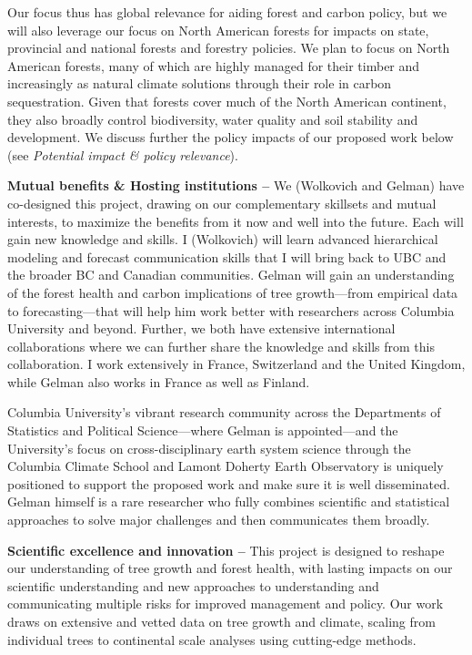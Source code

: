 \documentclass[11pt]{article}
\begin{document}
Our focus thus has global relevance for aiding forest and carbon policy, but we will also leverage our focus on North American forests for impacts on state, provincial and national forests and forestry policies. We plan to focus on North American forests, many of which are highly managed for their timber and increasingly as natural climate solutions through their role in carbon sequestration. Given that forests cover much of the North American continent, they also broadly control biodiversity, water quality and soil stability and development. We discuss further the policy impacts of our proposed work below (see \emph{Potential impact \& policy relevance}). 


{\bf Mutual benefits \& Hosting institutions -- }
We (Wolkovich and Gelman) have co-designed this project, drawing on our complementary skillsets and mutual interests, to maximize the benefits from it now and well into the future. Each will gain new knowledge and skills. I (Wolkovich) will learn advanced hierarchical modeling and forecast communication skills that I will bring back to UBC and the broader BC and Canadian communities. Gelman will gain an understanding of the forest health and carbon implications of tree growth---from empirical data to forecasting---that will help him work better with researchers across Columbia University and beyond. Further, we both have extensive international collaborations where we can further share the knowledge and skills from this collaboration. I work extensively in France, Switzerland and the United Kingdom, while Gelman also works in France as well as Finland. 

Columbia University's vibrant research community across the Departments of Statistics and Political Science---where Gelman is appointed---and the University's focus on cross-disciplinary earth system science through the Columbia Climate School and Lamont Doherty Earth Observatory is uniquely positioned to support the proposed work and make sure it is well disseminated. Gelman himself is a rare researcher who fully combines scientific and statistical approaches to solve major challenges and then communicates them broadly. %

{\bf Scientific excellence and innovation -- } 
This project is designed to reshape our understanding of tree growth and forest health, with lasting impacts on our scientific understanding and new approaches to understanding and communicating multiple risks for improved management and policy. Our work draws on extensive and vetted data on tree growth and climate, scaling from individual trees to continental scale analyses using cutting-edge methods. 
\end{document}
